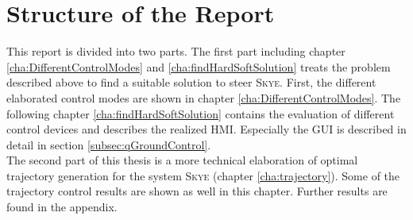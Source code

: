 \section{Structure of the Report}
\label{structure}
This report is divided into two parts. The first part including chapter \ref{cha:DifferentControlModes} and \ref{cha:findHardSoftSolution} treats the problem described above to find a suitable solution to steer \textsc{Skye}. First, the different elaborated control modes are shown in chapter \ref{cha:DifferentControlModes}. The following chapter \ref{cha:findHardSoftSolution} contains the evaluation of different control devices and describes the realized HMI. Especially the GUI is described in detail in section \ref{subsec:qGroundControl}. \\ The second part of this thesis is a more technical elaboration of optimal trajectory generation for the system \textsc{Skye} (chapter \ref{cha:trajectory}). Some of the trajectory control results are shown as well in this chapter. Further results are found in the appendix.